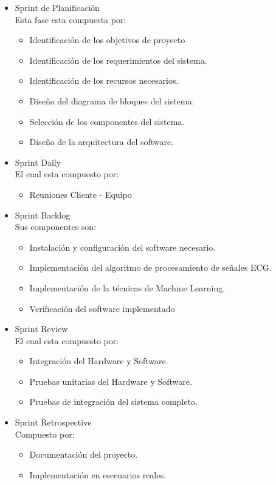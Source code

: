 \begin{itemize}
    \item Sprint de Planificación\\
          Esta fase esta compuesta por:
          \begin{itemize}
              \item Identificación de los objetivos de proyecto
              \item Identificación de los requerimientos del sistema.
              \item Identificación de los recursos necesarios.
              \item Diseño del diagrama de bloques del sistema.
              \item Selección de los componentes del sistema.
              \item Diseño de la arquitectura del software.
          \end{itemize}
    \item Sprint Daily\\
          El cual esta compuesto por:
          \begin{itemize}
              \item Reuniones Cliente - Equipo
          \end{itemize}
    \item Sprint Backlog\\
          Sus componentes son:
          \begin{itemize}
              \item Instalación y configuración del software necesario.
              \item Implementación del algoritmo de procesamiento de señales ECG.
              \item Implementación de la técnicas de Machine Learning.
              \item Verificación del software implementado
          \end{itemize}
    \item Sprint Review\\
          El cual esta compuesto por:
          \begin{itemize}
              \item Integración del Hardware y Software.
              \item Pruebas unitarias del Hardware y Software.
              \item Pruebas de integración del sistema completo.
          \end{itemize}
    \item Sprint Retrospective\\
          Compuesto por:
          \begin{itemize}
              \item Documentación del proyecto.
              \item Implementación en escenarios reales.
          \end{itemize}
\end{itemize}

